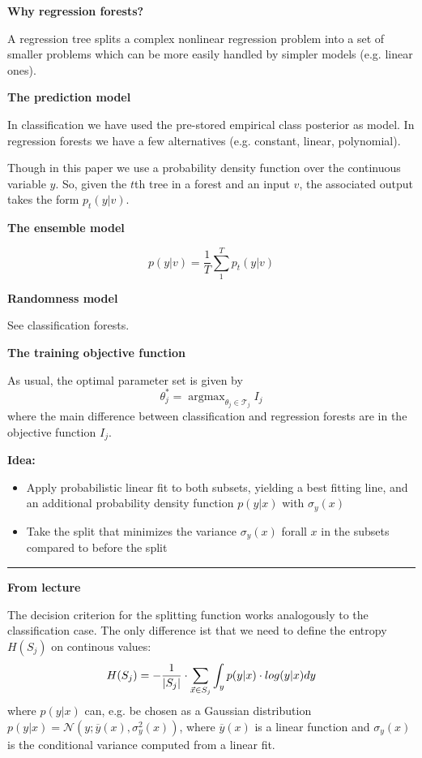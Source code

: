 \documentclass{scrartcl}
\DeclareMathOperator*{\argmax}{argmax} %
\DeclarePairedDelimiter\abs{\lvert}{\rvert}%
\begin{document}
\begin{appendices}
\textbf{Why regression forests?}

A regression tree splits a complex nonlinear regression problem into a set of smaller problems which can be more easily handled by simpler models (e.g. linear ones).

\textbf{The prediction model}

In classification we have used the pre-stored empirical class posterior as model. In regression forests we have a few alternatives (e.g. constant, linear, polynomial).

Though in this paper we use a probability density function over the continuous variable \(y\). So, given the \(t\)th tree in a forest and an input \(v\), the associated output takes the form \(p_t(y|v)\).

\textbf{The ensemble model}

\[p(y|v) = \frac{1}{T} \sum_1^T p_t(y|v)\]

\textbf{Randomness model}

See classification forests.

\textbf{The training objective function}

As usual, the optimal parameter set is given by
\[\theta_j^* = \argmax_{\theta_j \in \mathcal{T}_j} I_j\]
where the main difference between classification and regression forests are in the objective function \(I_j\).

\textbf{Idea:}
\begin{itemize}
    \item
        Apply probabilistic linear fit to both subsets, yielding a best fitting line, and an additional probability density function \(p(y|x)\) with \(\sigma_y(x)\)
    \item
        Take the split that minimizes the variance \(\sigma_y(x)\) forall \(x\) in the subsets compared to before the split
\end{itemize}



\rule{\textwidth}{1pt}
\textbf{From lecture}

The decision criterion for the splitting function works analogously to the classification case. The only difference ist that we need to define the entropy \(H(S_j)\) on continous values:
\[H(S_j) = -\frac{1}{\abs{S_j}} \cdot \sum_{\vec{x} \in S_j} \int_y p(y|x) \cdot log(y|x)dy\]
where \(p(y|x)\) can, e.g. be chosen as a Gaussian distribution \(p(y|x) = \mathcal{N}(y; \overline{y}(x), \sigma_y^2(x))\), where \(\overline{y}(x)\) is a linear function and \(\sigma_y(x)\) is the conditional variance computed from a linear fit.


\end{appendices}
\end{document}
